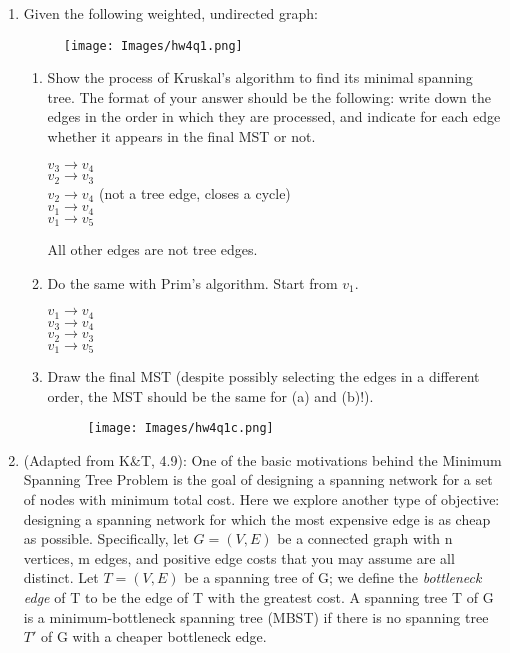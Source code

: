 \documentclass[letterpaper, 11pt]{article}
\begin{document}
\begin{enumerate}
    \item Given the following weighted, undirected graph:

    \begin{figure}[H]
        \centering
        \texttt{[image: Images/hw4q1.png]}
    \end{figure}

    \begin{enumerate}
        \item Show the process of Kruskal’s algorithm to find its minimal spanning tree. The format of your answer should be the following: write down the edges in the order in which they are processed, and indicate for each edge whether it appears in the final MST or not.

        $v_3 \to v_4$\\
        $v_2 \to v_3$\\
        $v_2 \to v_4$ (not a tree edge, closes a cycle)\\
        $v_1 \to v_4$\\
        $v_1 \to v_5$

        All other edges are not tree edges.
        
        \item Do the same with Prim’s algorithm. Start from $v_1$.

        $v_1 \to v_4$\\
        $v_3 \to v_4$\\
        $v_2 \to v_3$\\
        $v_1 \to v_5$
        
        \item Draw the final MST (despite possibly selecting the edges in a different order, the MST should be the same for (a) and (b)!).
        \begin{figure}[H]
            \centering
            \texttt{[image: Images/hw4q1c.png]}
        \end{figure}
    \end{enumerate}

    \item (Adapted from K\&T, 4.9): One of the basic motivations behind the Minimum Spanning Tree Problem is the goal of designing a spanning network for a set of nodes with minimum total cost. Here we explore another type of objective: designing a spanning network for which the most expensive edge is as cheap as possible. Specifically, let $G = (V,E)$ be a connected graph with n vertices, m edges, and positive edge costs that you may assume are all distinct. Let $T = (V,E)$ be a spanning tree of G; we define the \textit{bottleneck edge} of T to be the edge of T with the greatest cost. A spanning tree T of G is a minimum-bottleneck spanning tree (MBST) if there is no spanning tree $T'$ of G with a cheaper bottleneck edge.


\end{enumerate}
\end{document}
